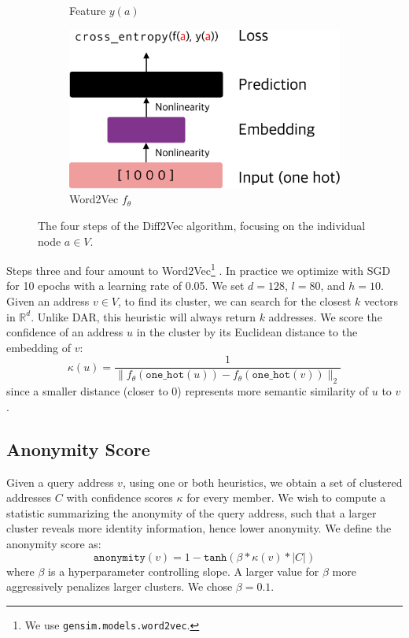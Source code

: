 \documentclass[11pt,a4paper]{article}
\begin{document}
\begin{figure}[h!]
\begin{subfigure}[b]{0.4\linewidth}
  \caption{Feature $y(a)$}
  \end{subfigure}
  \hfill
  \begin{subfigure}[b]{0.4\linewidth}
  \centering
  \includegraphics[width=\textwidth]{figures/diff2vec4}
  \caption{Word2Vec $f_\theta$}
  \end{subfigure}
  \hfill
\caption{The four steps of the Diff2Vec algorithm, focusing on the individual node $a \in V$.}
\label{fig:diff2vec}
\end{figure}

Steps three and four amount to Word2Vec\footnote{We use \texttt{gensim.models.word2vec}.} \citep{mikolov2013efficient,mikolov2013distributed}. In practice we optimize with SGD for 10 epochs with a learning rate of 0.05. We set $d = 128$, $l = 80$, and $h = 10$. Given an address $v \in V$, to find its cluster, we can search for the closest $k$ vectors in $\mathbb{R}^d$. Unlike DAR, this heuristic will always return $k$ addresses. We score the confidence of an address $u$ in the cluster by its Euclidean distance to the embedding of $v$:
\begin{equation*}
\kappa(u) = \frac{1}{\|f_\theta(\texttt{one\_hot}(u)) - f_\theta(\texttt{one\_hot}(v))\|_2}
\end{equation*}
since a smaller distance (closer to 0) represents more semantic similarity of $u$ to $v$.

\subsection{Anonymity Score}
\label{sec:anonymityscore}

Given a query address $v$, using one or both heuristics, we obtain a set of clustered addresses $C$ with confidence scores $\kappa$ for every member. We wish to compute a statistic summarizing the anonymity of the query address, such that a larger cluster reveals more identity information, hence lower anonymity. We define the anonymity score as:
\begin{equation}
\texttt{anonymity}(v) = 1 - \texttt{tanh}(\beta * \kappa(v) * |C|)
\label{eq:anonymity}
\end{equation}
where $\beta$ is a hyperparameter controlling slope. A larger value for $\beta$ more aggressively penalizes larger clusters. We chose $\beta = 0.1$.
\end{document}
